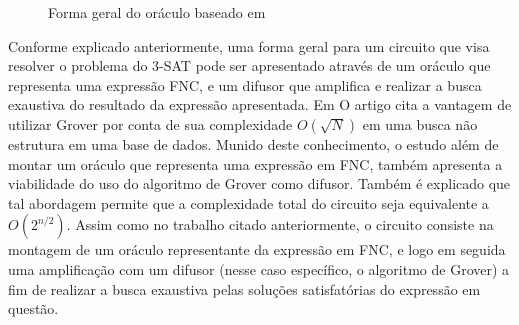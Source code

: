 \documentclass[12pt]{article}
\begin{document}
\begin{figure}[ht]
\centering
{}
\caption{Forma geral do oráculo baseado em \cite{parallelAndDistributed}}
\label{fig:oraculo_forma_geral2}
\end{figure}

Conforme explicado anteriormente, uma forma geral para um circuito que visa resolver o problema do 3-SAT pode ser apresentado através de um oráculo que representa uma expressão FNC, e um difusor que amplifica e realizar a busca exaustiva do resultado da expressão apresentada. Em \cite{wang:20} O artigo cita a vantagem de utilizar Grover por conta de sua complexidade $O \left( \sqrt{N} \right)$ em uma busca não estrutura em uma base de dados. Munido deste conhecimento, o estudo além de montar um oráculo que representa uma expressão em FNC, também apresenta a viabilidade do uso do algoritmo de Grover como difusor. Também é explicado que tal abordagem permite que a complexidade total do circuito seja equivalente a $O(2^{n/2})$. Assim como no trabalho citado anteriormente, o circuito consiste na montagem de um oráculo representante da expressão em FNC, e logo em seguida uma amplificação com um difusor (nesse caso específico, o algoritmo de Grover) a fim de realizar a busca exaustiva pelas soluções satisfatórias do expressão em questão.
\end{document}

